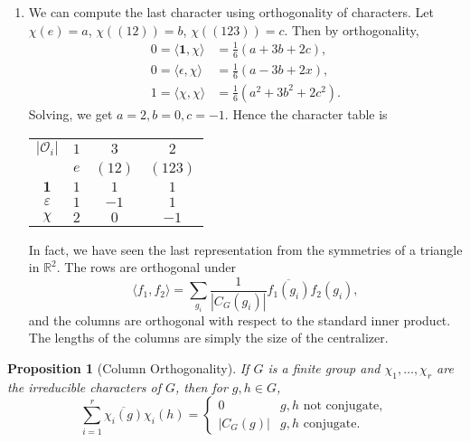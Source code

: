\documentclass[12pt]{article}
\newtheorem{proposition}{Proposition}[section]
\theoremstyle{definition}
\theoremstyle{remark}
\begin{document}
\begin{adjustbox}{minipage = \columnwidth - 25.5pt, margin=1em, frame=1pt, margin=0em}
\begin{enumerate}
	\item[]
		We can compute the last character using orthogonality of characters. Let $\chi(e) = a$, $\chi((12)) = b$, $\chi((123)) = c$. Then by orthogonality,
		\begin{align*}
			0 = \langle \mathbf{1}, \chi \rangle &= \frac{1}{6} (a + 3b + 2c), \\
			0 = \langle \epsilon, \chi \rangle &= \frac{1}{6} (a - 3b + 2x), \\
			1 = \langle \chi, \chi \rangle &= \frac{1}{6}(a^2 + 3b^2 + 2c^2).
		\end{align*}
		Solving, we get $a = 2, b = 0, c = -1$. Hence the character table is
\begin{center}
\begin{tabular}{c|ccc}
	$|\mathcal{O}_i|$ & $1$ & $3$ & $2$ \\
			  & $e$ & $(12)$ & $(123)$ \\
			  \hline
	$\mathbf{1}$ & $1$ & $1$ & $1$ \\
	$\varepsilon$ & $1$ & $-1$ & $1$ \\
	$\chi$ & $2$ & $0$ & $-1$ \\
\end{tabular}
\end{center}
		In fact, we have seen the last representation from the symmetries of a triangle in $\mathbb{R}^2$. The rows are orthogonal under
		\[
			\langle f_1, f_2 \rangle = \sum_{g_i} \frac{1}{|C_G(g_i)|}\overline{f_1(g_i)}f_2(g_i)
		,\]
		and the columns are orthogonal with respect to the standard inner product. The lengths of the columns are simply the size of the centralizer.

\end{enumerate}

\end{adjustbox}

\begin{proposition}[Column Orthogonality]
	If $G$ is a finite group and $\chi_1, \ldots, \chi_r$ are the irreducible characters of $G$, then for $g, h \in G$,
	\[
		\sum_{i = 1}^{r} \overline{\chi_i(g)}\chi_i(h) =
		\begin{cases}
			0 & g, h \text{ not conjugate}, \\
			|C_G(g)| & g, h \text{ conjugate}.
		\end{cases}
	\]
\end{proposition}
\end{document}
